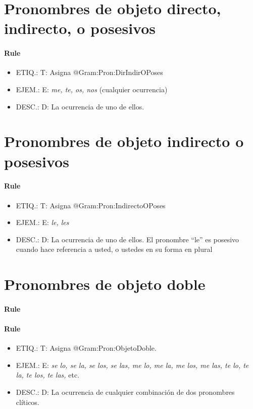 \documentclass[11pt]{report}
\begin{document}
\section{Pronombres de objeto directo, indirecto, o posesivos}
\paragraph*{Rule}
\begin{itemize}
\item ETIQ.:  T: Asigna @Gram:Pron:DirIndirOPoses
\item EJEM.:  E: \emph{me, te, os, nos} (cualquier ocurrencia)
\item DESC.:  D: La ocurrencia de uno de ellos.
\end{itemize}

\section{Pronombres de objeto indirecto o posesivos}
\paragraph*{Rule}
\begin{itemize}
\item ETIQ.:  T: Asigna @Gram:Pron:IndirectoOPoses
\item EJEM.:  E: \emph{le, les}
\item DESC.:  D: La ocurrencia de uno de ellos. El pronombre ``le'' es posesivo cuando hace referencia a usted, o ustedes en su forma en plural
\end{itemize}

\section{Pronombres de objeto doble}
\paragraph*{Rule}
\paragraph*{Rule}
\begin{itemize}
\item ETIQ.:  T: Asigna @Gram:Pron:ObjetoDoble.
\item EJEM.:  E: \emph{se lo, se la, se los, se las, me lo, me la, me los, me las, te lo, te la, te los, te las,} etc.
\item DESC.:  D: La ocurrencia de cualquier combinación de dos pronombres clíticos.
\end{itemize}
\end{document}
